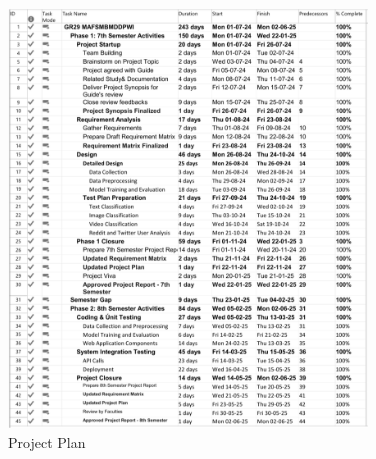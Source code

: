\begin{figure}[H]  
    \centering
    \includegraphics[width=0.85\textwidth]{Images/MS Project Plan Sem 7.png}  
    \caption*{Project Plan}
    \label{Project Plan}  %
\end{figure}

\pagebreak

